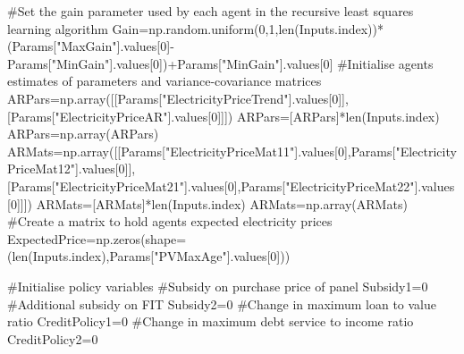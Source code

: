 \documentclass[
  letterpaper,
  DIV=11,
  numbers=noendperiod]{scrartcl}
\newenvironment{Shaded}{\begin{snugshade}}{\end{snugshade}}
\newcommand{\BuiltInTok}[1]{\textcolor[rgb]{0.00,0.23,0.31}{#1}}
\newcommand{\CommentTok}[1]{\textcolor[rgb]{0.37,0.37,0.37}{#1}}
\newcommand{\DecValTok}[1]{\textcolor[rgb]{0.68,0.00,0.00}{#1}}
\newcommand{\NormalTok}[1]{\textcolor[rgb]{0.00,0.23,0.31}{#1}}
\newcommand{\OperatorTok}[1]{\textcolor[rgb]{0.37,0.37,0.37}{#1}}
\newcommand{\StringTok}[1]{\textcolor[rgb]{0.13,0.47,0.30}{#1}}
\begin{document}
\begin{Shaded}
\begin{Highlighting}[]
    \CommentTok{\#Set the gain parameter used by each agent in the recursive least squares learning algorithm}
\NormalTok{    Gain}\OperatorTok{=}\NormalTok{np.random.uniform(}\DecValTok{0}\NormalTok{,}\DecValTok{1}\NormalTok{,}\BuiltInTok{len}\NormalTok{(Inputs.index))}\OperatorTok{*}\NormalTok{(Params[}\StringTok{"MaxGain"}\NormalTok{].values[}\DecValTok{0}\NormalTok{]}\OperatorTok{{-}}\NormalTok{Params[}\StringTok{"MinGain"}\NormalTok{].values[}\DecValTok{0}\NormalTok{])}\OperatorTok{+}\NormalTok{Params[}\StringTok{"MinGain"}\NormalTok{].values[}\DecValTok{0}\NormalTok{]}
    \CommentTok{\#Initialise agents\textquotesingle{} estimates of parameters and variance{-}covariance matrices}
\NormalTok{    ARPars}\OperatorTok{=}\NormalTok{np.array([[Params[}\StringTok{"ElectricityPriceTrend"}\NormalTok{].values[}\DecValTok{0}\NormalTok{]],[Params[}\StringTok{"ElectricityPriceAR"}\NormalTok{].values[}\DecValTok{0}\NormalTok{]]])}
\NormalTok{    ARPars}\OperatorTok{=}\NormalTok{[ARPars]}\OperatorTok{*}\BuiltInTok{len}\NormalTok{(Inputs.index)}
\NormalTok{    ARPars}\OperatorTok{=}\NormalTok{np.array(ARPars)}
\NormalTok{    ARMats}\OperatorTok{=}\NormalTok{np.array([[Params[}\StringTok{"ElectricityPriceMat11"}\NormalTok{].values[}\DecValTok{0}\NormalTok{],Params[}\StringTok{"ElectricityPriceMat12"}\NormalTok{].values[}\DecValTok{0}\NormalTok{]],[Params[}\StringTok{"ElectricityPriceMat21"}\NormalTok{].values[}\DecValTok{0}\NormalTok{],Params[}\StringTok{"ElectricityPriceMat22"}\NormalTok{].values[}\DecValTok{0}\NormalTok{]]])}
\NormalTok{    ARMats}\OperatorTok{=}\NormalTok{[ARMats]}\OperatorTok{*}\BuiltInTok{len}\NormalTok{(Inputs.index)}
\NormalTok{    ARMats}\OperatorTok{=}\NormalTok{np.array(ARMats)}
    \CommentTok{\#Create a matrix to hold agents\textquotesingle{} expected electricity prices}
\NormalTok{    ExpectedPrice}\OperatorTok{=}\NormalTok{np.zeros(shape}\OperatorTok{=}\NormalTok{(}\BuiltInTok{len}\NormalTok{(Inputs.index),Params[}\StringTok{"PVMaxAge"}\NormalTok{].values[}\DecValTok{0}\NormalTok{]))}

    \CommentTok{\#Initialise policy variables}
    \CommentTok{\#Subsidy on purchase price of panel}
\NormalTok{    Subsidy1}\OperatorTok{=}\DecValTok{0}
    \CommentTok{\#Additional subsidy on FIT}
\NormalTok{    Subsidy2}\OperatorTok{=}\DecValTok{0}
    \CommentTok{\#Change in maximum loan to value ratio}
\NormalTok{    CreditPolicy1}\OperatorTok{=}\DecValTok{0}
    \CommentTok{\#Change in maximum debt service to income ratio}
\NormalTok{    CreditPolicy2}\OperatorTok{=}\DecValTok{0}


\end{Highlighting}
\end{Shaded}
\end{document}
